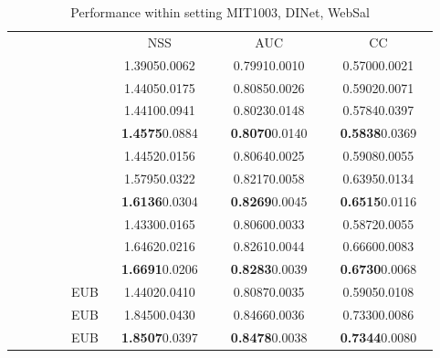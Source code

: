\documentclass[runningheads]{llncs}
\begin{document}
\begin{table}[!t]
	\centering
	\caption{Performance within setting MIT1003, DINet, WebSal}
	\footnotesize
\begin{tabular}{lcccc}
		\toprule
		
		& & NSS & AUC & CC \\
		\cmidrule(lr){3-3} \cmidrule(lr){4-4} \cmidrule(lr){5-5}
		 &  & ~~1.39050.0062~~ & ~~0.79910.0010~~ & ~~0.57000.0021~~ \\ \midrule
		
 &  & 1.44050.0175 & 0.80850.0026 & 0.59020.0071 \\
		 &  & 1.44100.0941 & 0.80230.0148 & 0.57840.0397 \\
		 &  & \textbf{1.4575}0.0884 & \textbf{0.8070}0.0140 & \textbf{0.5838}0.0369 \\ \midrule
		
~~~~~~~ &  & 1.44520.0156 & 0.80640.0025 & 0.59080.0055  \\
		 &  & 1.57950.0322 & 0.82170.0058 & 0.63950.0134  \\
		 &  & \textbf{1.6136}0.0304 & \textbf{0.8269}0.0045 & \textbf{0.6515}0.0116 \\ \midrule
		
 &  & 1.43300.0165 & 0.80600.0033 & 0.58720.0055  \\
		 &  & 1.64620.0216 & 0.82610.0044 & 0.66600.0083  \\
		 &  & \textbf{1.6691}0.0206 & \textbf{0.8283}0.0039 & \textbf{0.6730}0.0068 \\ \midrule
		
 & EUB & 1.44020.0410 & 0.80870.0035 & 0.59050.0108 \\
		 & EUB & 1.84500.0430 & 0.84660.0036 & 0.73300.0086 \\
		 & EUB & \textbf{1.8507}0.0397 & \textbf{0.8478}0.0038 & \textbf{0.7344}0.0080 \\
		\bottomrule	
	\end{tabular}
	\label{tbl:m_d_w_sup}
\end{table}
\end{document}
